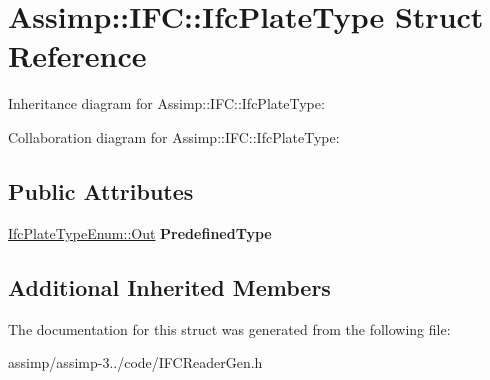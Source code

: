 \hypertarget{struct_assimp_1_1_i_f_c_1_1_ifc_plate_type}{\section{Assimp\+:\+:I\+F\+C\+:\+:Ifc\+Plate\+Type Struct Reference}
\label{struct_assimp_1_1_i_f_c_1_1_ifc_plate_type}
}


Inheritance diagram for Assimp\+:\+:I\+F\+C\+:\+:Ifc\+Plate\+Type\+:


Collaboration diagram for Assimp\+:\+:I\+F\+C\+:\+:Ifc\+Plate\+Type\+:
\subsection*{Public Attributes}
\begin{DoxyCompactItemize}
\item 
\hypertarget{struct_assimp_1_1_i_f_c_1_1_ifc_plate_type_ae361afe17c0f4ffd6d42982e86affae4}{\hyperlink{classboost_1_1shared__ptr}{Ifc\+Plate\+Type\+Enum\+::\+Out} {\bfseries Predefined\+Type}}\label{struct_assimp_1_1_i_f_c_1_1_ifc_plate_type_ae361afe17c0f4ffd6d42982e86affae4}

\end{DoxyCompactItemize}
\subsection*{Additional Inherited Members}


The documentation for this struct was generated from the following file\+:\begin{DoxyCompactItemize}
\item 
assimp/assimp-\/3../code/I\+F\+C\+Reader\+Gen.\+h\end{DoxyCompactItemize}
